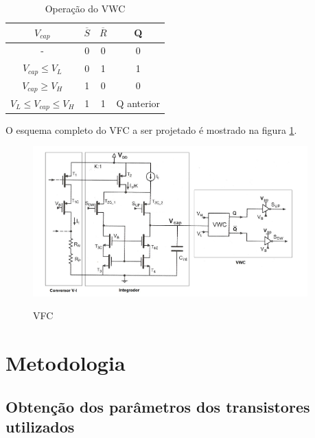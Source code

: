 \documentclass[
	12pt,				%
	oneside,			%
	a4paper,			%
	english,			%
	french,				%
	spanish,			%
	brazil				%
	]{abntex2}
\begin{document}
\begin{table}[h]
    \begin{center}    
    \begin{tabular}{ | c | c | c | c | }
    \hline
    \(V_{cap}\) & \(\overline{S}\) & \(\overline{R}\) & Q \\ 
    \hline
    - & 0 & 0 & 0 \\ 
    \hline
    \(V_{cap} \leq V_{L}\) & 0 & 1 & 1 \\ 
    \hline
    \(V_{cap} \geq V_{H}\) & 1 & 0 & 0 \\ 
    \hline
    \(V_{L} \leq V_{cap} \leq V_{H}\) & 1 & 1 & Q anterior \\
    \hline
    \end{tabular}
    \caption[Operação do VWC]{Operação do VWC }
    \label{tabFlipFlop}
    \end{center}
\end{table}

O esquema completo do VFC a ser projetado é mostrado na figura \ref{VFC_final}.

\begin{figure}[!ht]
  \centering
  \includegraphics[width=300pt]{VFC_final.jpeg}\\
  \caption{VFC}\label{VFC_final}
\end{figure}

\chapter{Metodologia}

\section{Obtenção dos parâmetros dos transistores utilizados}
\end{document}

